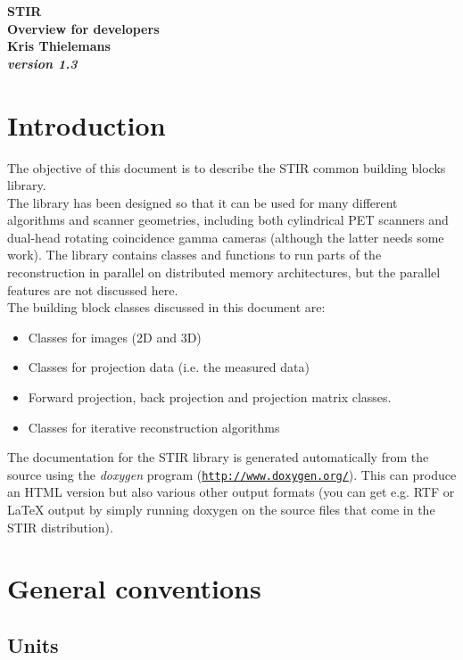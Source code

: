 \documentclass{article}
\def\R2Lurl#1#2{\mbox{\href{#1}{\tt #2}}}
\begin{document}
\begin{center}
\textbf{{\huge STIR \\
Overview for developers}}\\
\textbf{Kris Thielemans}\\
\textbf{\textit{version 1.3}}


\end{center}

\tableofcontents


\section{
Introduction}

The objective of this document is to describe the STIR common 
building blocks library.\\
The library has been designed so that it can be used for many 
different algorithms and scanner geometries, including both cylindrical 
PET scanners and dual-head rotating coincidence gamma cameras 
(although the latter needs some work). The library contains classes 
and functions to run parts of the reconstruction in parallel 
on distributed memory architectures, but the parallel features 
are not discussed here.\\
The building block classes discussed in this document are:
\begin{itemize}
\item
Classes for images (2D and 3D)
\item 
Classes for projection data (i.e. the measured data)
\item 
Forward projection, back projection and projection matrix classes.
\item 
Classes for iterative reconstruction algorithms
\end{itemize}

The documentation
for the STIR library is generated automatically from the source 
using the \textit{doxygen} program (\R2Lurl{http://www.doxygen.org/ }{http://www.doxygen.org/}). 
This can produce an HTML version but also various other output 
formats (you can get e.g. RTF or LaTeX output by simply running 
doxygen on the source files that come in the STIR distribution). 


\section{
General conventions}



\subsection{
Units }
\end{document}
